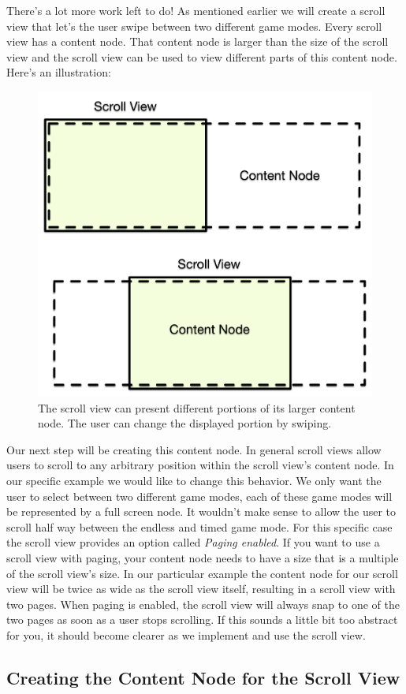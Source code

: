There's a lot more work left to do! As mentioned earlier we will create a scroll
view that let's the user swipe between two different game modes. Every scroll
view has a content node. That content node is larger than the size of the scroll
view and the scroll view can be used to view different parts of this content
node. Here's an illustration:

\begin{figure}[H]
		\centering
		\includegraphics[width=0.5\linewidth]{images/Chapter7/scrollview_concept.png}
		\caption{The scroll view can present different portions of its larger content
		node. The user can change the displayed portion by swiping.}
\end{figure}

Our next step will be creating this content node. In general scroll views allow
users to scroll to any arbitrary position within the scroll view's content node.
In our specific example we would like to change this behavior. We only
want the user to select between two different game modes, each of these game modes will be
represented by a full screen node. It wouldn't make sense to allow the user to
scroll half way between the endless and timed game mode. For this specific case
the scroll view provides an option called \textit{Paging enabled}. If you want
to use a scroll view with paging, your content node needs to have a size that is
a multiple of the scroll view's size. In our particular example the content node
for our scroll view will be twice as wide as the scroll view itself, resulting
in a scroll view with two pages. When paging is enabled, the scroll view will
always snap to one of the two pages as soon as a user stops scrolling. If this
sounds a little bit too abstract for you, it should become clearer as we implement and use the scroll view.

\subsection{Creating the Content Node for the Scroll View}

